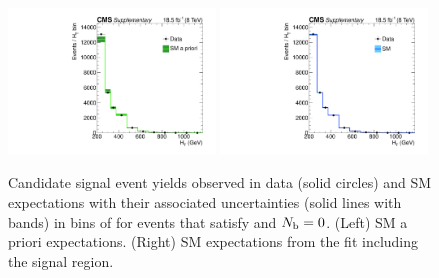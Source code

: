 
\maketitle


\clearpage
\begin{figure}[h!]
  \begin{center}
    \includegraphics[width=0.49\textwidth,page=2]{figures/fit_result/bestFit_2012dev_RQcdZero_fZinvAll_0b_le3j-12p_smOnly} 
    \includegraphics[width=0.49\textwidth,page=2]{figures/fit_result/bestFit_2012dev_RQcdZero_fZinvAll_0b_le3j-12hp_smOnly} \\
    \caption{\label{fig:best-fit-0b} Candidate signal event yields
      observed in data (solid circles) and SM expectations with their
      associated uncertainties (solid lines with bands) in bins of
      \scalht for events that satisfy \njetlow and $N_{\text{b}} = 0$. (Left)
      SM a priori expectations. (Right) SM expectations from the fit
      including the signal region. }
  \end{center}
\end{figure}

